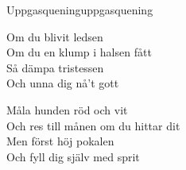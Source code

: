 \begin{song}{Uppgasquening}{uppgasquening}
\begin{vers}
Om du blivit ledsen\\
Om du en klump i halsen fått\\
Så dämpa tristessen \\
Och unna dig nå't gott\\
\end{vers}
\begin{vers}
Måla hunden röd och vit\\
Och res till månen om du hittar dit\\
Men först höj pokalen\\
Och fyll dig själv med sprit\\
\end{vers}
\end{song}
